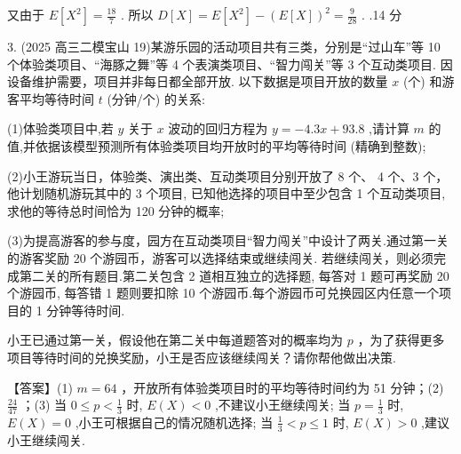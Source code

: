 \documentclass[10pt]{article}
\begin{document}
又由于 \(E\left\lbrack  {X}^{2}\right\rbrack   = \frac{18}{7}\) . 所以 \(D\left\lbrack  X\right\rbrack   = E\left\lbrack  {X}^{2}\right\rbrack   - {\left( E\left\lbrack  X\right\rbrack  \right) }^{2} = \frac{9}{28}\) . .14 分

3. (2025 高三二模宝山 19)某游乐园的活动项目共有三类，分别是“过山车”等 10 个体验类项目、“海豚之舞”等 4 个表演类项目、“智力闯关”等 3 个互动类项目. 因设备维护需要，项目并非每日都全部开放. 以下数据是项目开放的数量 \(x\) (个) 和游客平均等待时间 \(t\) (分钟/个) 的关系:

\begin{center}
\end{center}

(1)体验类项目中,若 \(y\) 关于 \(x\) 波动的回归方程为 \(y =  - {4.3x} + {93.8}\) ,请计算 \(m\) 的值,并依据该模型预测所有体验类项目均开放时的平均等待时间 (精确到整数);

(2)小王游玩当日，体验类、演出类、互动类项目分别开放了 8 个、 4 个、3 个，他计划随机游玩其中的 3 个项目, 已知他选择的项目中至少包含 1 个互动类项目, 求他的等待总时间恰为 120 分钟的概率;

(3)为提高游客的参与度，园方在互动类项目“智力闯关”中设计了两关.通过第一关的游客奖励 20 个游园币，游客可以选择结束或继续闯关. 若继续闯关，则必须完成第二关的所有题目.第二关包含 2 道相互独立的选择题, 每答对 1 题可再奖励 20 个游园币, 每答错 1 题则要扣除 10 个游园币.每个游园币可兑换园区内任意一个项目的 1 分钟等待时间.

小王已通过第一关，假设他在第二关中每道题答对的概率均为 \(p\) ，为了获得更多项目等待时间的兑换奖励，小王是否应该继续闯关？请你帮他做出决策.

【答案】(1) \(m = {64}\) ，开放所有体验类项目时的平均等待时间约为 51 分钟；(2) \(\frac{24}{47}\) ；(3) 当 \(0 \leq  p < \frac{1}{3}\) 时, \(E\left( X\right)  < 0\) ,不建议小王继续闯关; 当 \(p = \frac{1}{3}\) 时, \(E\left( X\right)  = 0\) ,小王可根据自己的情况随机选择; 当 \(\frac{1}{3} < p \leq  1\) 时, \(E\left( X\right)  > 0\) ,建议小王继续闯关.
\end{document}
